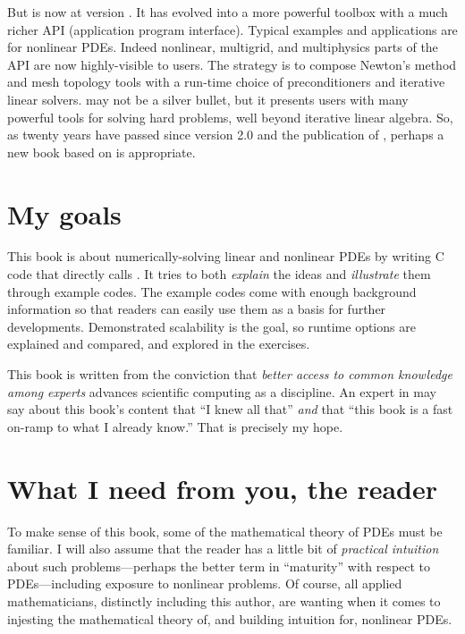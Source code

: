 But \PETSc is now at version \PETSCVERSION.  It has evolved into a more powerful toolbox with a much richer API (application program interface).  Typical examples and applications are for nonlinear PDEs.  Indeed nonlinear, multigrid, and multiphysics parts of the API are now highly-visible to users.  The \PETSc strategy is to compose Newton's method and mesh topology tools with a run-time choice of preconditioners and iterative linear solvers.  \PETSc may not be a silver bullet, but it presents users with many powerful tools for solving hard problems, well beyond iterative linear algebra.  So, as twenty years have passed since version 2.0 and the publication of \citet{Smithetal1996}, perhaps a new book based on \PETSc is appropriate.

\section{My goals}

This book is about numerically-solving linear and nonlinear PDEs by writing C code that directly calls \PETSc.  It tries to both \emph{explain} the ideas and \emph{illustrate} them through example codes.  The example codes come with enough background information so that readers can easily use them as a basis for further developments.  Demonstrated scalability is the goal, so runtime options are explained and compared, and explored in the exercises.

This book is written from the conviction that \emph{better access to common knowledge among experts} advances scientific computing as a discipline.  An expert in \PETSc may say about this book's content that ``I knew all that'' \emph{and} that ``this book is a fast on-ramp to what I already know.''  That is precisely my hope.

\section{What I need from you, the reader}

To make sense of this book, some of the mathematical theory of PDEs must be familiar.  I will also assume that the reader has a little bit of \emph{practical intuition} about such problems---perhaps the better term in ``maturity'' with respect to PDEs---including exposure to nonlinear problems.  Of course, all applied mathematicians, distinctly including this author, are wanting when it comes to injesting the mathematical theory of, and building intuition for, nonlinear PDEs.

